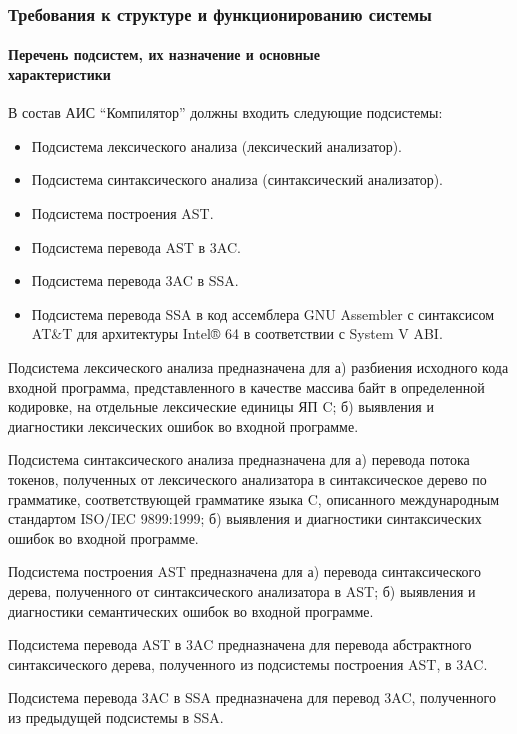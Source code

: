 \documentclass[14pt,russian]{extarticle}
\begin{document}
\subsubsection{Требования к структуре и функционированию системы}

\paragraph{Перечень подсистем, их назначение и основные\\характеристики}

В состав АИС \enquote{Компилятор} должны входить следующие подсистемы:

\begin{itemize}
	\item Подсистема лексического анализа (лексический анализатор).
	\item Подсистема синтаксического анализа (синтаксический анализатор).
	\item Подсистема построения AST.
	\item Подсистема перевода AST в 3AC.
	\item Подсистема перевода 3AC в SSA.
	\item Подсистема перевода SSA в код ассемблера GNU Assembler с синтаксисом AT\&T для архитектуры Intel® 64 в соответствии с System V ABI.
\end{itemize}

Подсистема лексического анализа предназначена для а) разбиения исходного кода
входной программа, представленного в качестве массива байт в определенной
кодировке, на отдельные лексические единицы ЯП C; б) выявления и диагностики
лексических ошибок во входной программе.

Подсистема синтаксического анализа предназначена для а) перевода потока токенов,
полученных от лексического анализатора в синтаксическое дерево по грамматике,
соответствующей грамматике языка C, описанного международным стандартом ISO/IEC
9899:1999; б) выявления и диагностики синтаксических ошибок во входной
программе.

Подсистема построения AST предназначена для а) перевода синтаксического дерева,
полученного от синтаксического анализатора в AST; б) выявления и диагностики
семантических ошибок во входной программе.

Подсистема перевода AST в 3AC предназначена для перевода абстрактного
синтаксического дерева, полученного из подсистемы построения AST, в 3AC.

Подсистема перевода 3AC в SSA предназначена для перевод 3AC, полученного из
предыдущей подсистемы в SSA.
\end{document}
